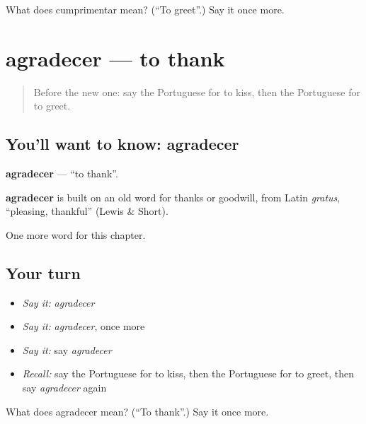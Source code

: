 \begin{tcolorbox}[breakable,colback=teal!4,colframe=teal!35!black,title={Before you move on}]
What does cumprimentar mean? (\textquotedblleft{}To greet\textquotedblright{}.) Say it once more.
\end{tcolorbox}
\section[agradecer]{agradecer — to thank}

\label{lesson:PT-C171-agradecer}



\begin{quote}
Before the new one: say the Portuguese for to kiss, then the Portuguese for to greet.
\end{quote}

\subsection*{You'll want to know: agradecer}
\textbf{agradecer} — \textquotedblleft{}to thank\textquotedblright{}.

\begin{cousinweb}
\textbf{agradecer} is built on an old word for thanks or goodwill, from Latin \emph{gratus}, \textquotedblleft{}pleasing, thankful\textquotedblright{} (Lewis \& Short).
\end{cousinweb}

\begin{grammarlens}[title={What you've built}]
One more word for this chapter.
\end{grammarlens}

\subsection*{Your turn}
\begin{itemize}
\raggedright
  \item \emph{Say it:} \emph{agradecer}
  \item \emph{Say it:} \emph{agradecer}, once more
  \item \emph{Say it:} say \emph{agradecer}
  \item \emph{Recall:} say the Portuguese for to kiss, then the Portuguese for to greet, then say \emph{agradecer} again
\end{itemize}

\begin{tcolorbox}[breakable,colback=teal!4,colframe=teal!35!black,title={Before you move on}]
What does agradecer mean? (\textquotedblleft{}To thank\textquotedblright{}.) Say it once more.
\end{tcolorbox}
